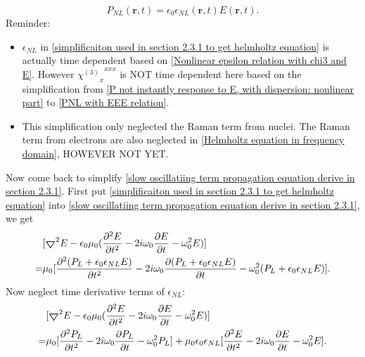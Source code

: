 \documentclass[12pt]{extarticle}
\numberwithin{equation}{section}
\numberwithin{figure}{section}
\numberwithin{table}{section}
\newcommand{\<}{\langle}
\renewcommand{\>}{\rangle}
\theoremstyle{definition}
\newcommand{\Lap}{\boldsymbol{\bigtriangledown}}
\begin{document}
\begin{itemize}
{\begin{equation}
                        P_{NL}(\boldsymbol{r},t)= \epsilon_0 \epsilon_{NL}(\boldsymbol{r},t) E(\boldsymbol{r},t).
                    \label{simplificaiton used in section 2.3.1 to get helmholtz equation}
                    \end{equation}
                    Reminder: 
                    \begin{itemize}
                        \item $\epsilon_{NL}$ in \autoref{simplificaiton used in section 2.3.1 to get helmholtz equation} is actually time dependent based on \autoref{Nonlinear epsilon relation with chi3 and E}. However ${{\chi^{(3)}}_x}^{xxx}$ is NOT time dependent here based on the simplification from \autoref{P not instantly response to E, with dispersion: nonlinear part} to \autoref{PNL with EEE relation}.
                        \item This simplification only neglected the Raman term from nuclei. The Raman term from electrons are also neglected in \autoref{Helmholtz equation in frequency domain}, HOWEVER NOT YET. 
                    \end{itemize}
                    }
                    
                    
                Now come back to simplify \autoref{slow oscillatiing term propagation equation derive in section 2.3.1}. First put \autoref{simplificaiton used in section 2.3.1 to get helmholtz equation} into \autoref{slow oscillatiing term propagation equation derive in section 2.3.1}, we get
                \begin{equation}
                \begin{split}
                    &[\Lap^2 E-\epsilon_0 \mu_0(\pdv[2]{E}{t}-2i\omega_0\pdv{E}{t}-\omega_0^2 E)]\\
                    =&\mu_0[\pdv[2]{(P_L+\epsilon_0 \epsilon_{NL} E)}{t}-2i\omega_0\pdv{(P_L+\epsilon_0 \epsilon_{NL} E)}{t}-\omega_0^2(P_L+\epsilon_0 \epsilon_{NL} E)].
                \end{split}
                \label{slow oscillatiing term propagation equation derive in section 2.3.1-part 2}
                \end{equation}
                Now neglect time derivative terms of $\epsilon_{NL}$:
                \begin{equation}
                \begin{split}
                    &[\Lap^2 E-\epsilon_0 \mu_0(\pdv[2]{E}{t}-2i\omega_0\pdv{E}{t}-\omega_0^2 E)]\\
                    =&\mu_0[\pdv[2]{P_L}{t}-2i\omega_0\pdv{P_L}{t}-\omega_0^2P_L]+\mu_0\epsilon_0\epsilon_{NL}[\pdv[2]{E}{t}-2i\omega_0\pdv{E}{t}-\omega_0^2 E].
                \end{split}
                \label{slow oscillatiing term propagation equation derive in section 2.3.1-part 3}
                \end{equation}
                

\end{itemize}
\end{document}
